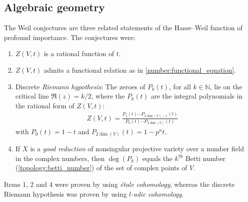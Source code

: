 \subsection{Algebraic geometry}

    \begin{remark}
        The Weil conjectures are three related statements of the Hasse--Weil function of profound importance. The conjectures were:
        \begin{enumerate}
            \item $Z(V,t)$ is a rational function of $t$.
            \item $Z(V,t)$ admits a functional relation as in \cref{number:functional_equation}.
            \item Discrete \textit{Riemann hypothesis}: The zeroes of $P_k(t)$, for all $k\in\mathbb{N}$, lie on the critical line $\Re(z)=k/2$, where the $P_k(t)$ are the integral polynomials in the rational form of $Z(V,t)$:
            \begin{gather}
                Z(V,t) = \frac{P_1(t)\cdots P_{2\dim(V)-1}(t)}{P_0(t)\cdots P_{2\dim(V)}(t)}
            \end{gather}
            with $P_0(t)=1-t$ and $P_{2\dim(V)}(t)=1-p^nt$.
            \item If $X$ is a \textit{good reduction} of nonsingular projective variety over a number field in the complex numbers, then $\deg(P_k)$ equals the $k^{\text{th}}$ Betti number (\cref{topology:betti_number}) of the set of complex points of $V$.
        \end{enumerate}
        Items 1, 2 and 4 were proven by  using \textit{\'etale cohomology}, whereas the discrete Riemann hypothesis was proven by  using \textit{$l$-adic cohomology}.
    \end{remark}

